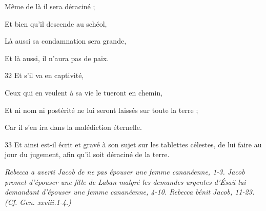 \par     Même de là il sera déraciné ;
\par    
\par     Et bien qu'il descende au schéol,  
\par     Là aussi sa condamnation sera grande,  
\par     Et là aussi, il n'aura pas de paix.  
\par    
\par 32 Et s'il va en captivité,  
\par     Ceux qui en veulent à sa vie le tueront en chemin,  
\par     Et ni nom ni postérité ne lui seront laissés sur toute la terre ;  
\par     Car il s'en ira dans la malédiction éternelle.
\par    
\par 33 Et ainsi est-il écrit et gravé à son sujet sur les tablettes célestes, de lui faire au jour du jugement, afin qu'il soit déraciné de la terre.


\par \textit{Rebecca a averti Jacob de ne pas épouser une femme cananéenne, 1-3. Jacob promet d'épouser une fille de Laban malgré les demandes urgentes d'Ésaü lui demandant d'épouser une femme cananéenne, 4-10. Rebecca bénit Jacob, 11-23. (Cf. Gen. xxviii.1-4.)}

